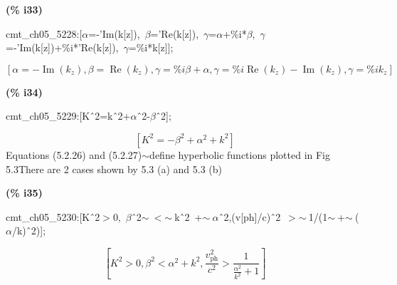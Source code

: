\documentclass[fleqn]{article}
\begin{document}
\noindent
\begin{minipage}[t]{4.000000em}\color{red}\bfseries
(\% i33)	
\end{minipage}
\begin{minipage}[t]{\textwidth}\color{blue}
cmt\_ch05\_5228:[\ensuremath{\alpha}=-'Im(k[z]),\ \ensuremath{\beta}='Re(k[z]),\ \ensuremath{\gamma}=\ensuremath{\alpha}+\%i*\ensuremath{\beta},\ \ensuremath{\gamma}=-'Im(k[z])+\%i*'Re(k[z]),\ \ensuremath{\gamma}=\%i*k[z]];
\end{minipage}
\[\displaystyle \tag{\% o33} 
\left[ \alpha =-\operatorname{Im}\left( {k_z}\right) \operatorname{,}\beta =\operatorname{Re}\left( {k_z}\right) \operatorname{,}\gamma =\% i \beta +\alpha \operatorname{,}\gamma =\% i \operatorname{Re}\left( {k_z}\right) -\operatorname{Im}\left( {k_z}\right) \operatorname{,}\gamma =\% i {k_z}\right] \mbox{}
\]


\noindent
\begin{minipage}[t]{4.000000em}\color{red}\bfseries
(\% i34)	
\end{minipage}
\begin{minipage}[t]{\textwidth}\color{blue}
cmt\_ch05\_5229:[K\^\ 2=k\^\ 2+\ensuremath{\alpha}\^\ 2-\ensuremath{\beta}\^\ 2];
\end{minipage}
\[\displaystyle \tag{\% o34} 
\left[ {{K}^{2}}=-{{\beta }^{2}}+{{\alpha }^{2}}+{{k}^{2}}\right] \mbox{}
\]
Equations (5.2.26) and (5.2.27)\ensuremath{\sim }define hyperbolic functions plotted in Fig 5.3There are 2 cases shown by 5.3 (a) and 5.3 (b)


\noindent
\begin{minipage}[t]{4.000000em}\color{red}\bfseries
(\% i35)	
\end{minipage}
\begin{minipage}[t]{\textwidth}\color{blue}
cmt\_ch05\_5230:[K\^\ 2\ensuremath{>}0,\ \ensuremath{\beta}\^\ 2\ensuremath{\sim\ }\ensuremath{<}\ensuremath{\sim\ }k\^\ 2\ +\ensuremath{\sim\ }\ensuremath{\alpha}\^\ 2,(v[ph]/c)\^\ 2\ \ensuremath{>}\ensuremath{\sim\ }1/(1\ensuremath{\sim\ }+\ensuremath{\sim\ }(\ensuremath{\alpha}/k)\^\ 2)];
\end{minipage}
\[\displaystyle \tag{\% o35} 
\left[ {{K}^{2}}\operatorname{>  }0\operatorname{,}{{\beta }^{2}}\operatorname{<  }{{\alpha }^{2}}+{{k}^{2}}\operatorname{,}\frac{{{v}_{\ensuremath{\mathrm{ph}}}^{2}}}{{{c}^{2}}}\operatorname{>  }\frac{1}{\frac{{{\alpha }^{2}}}{{{k}^{2}}}+1}\right] \mbox{}
\]
\end{document}
